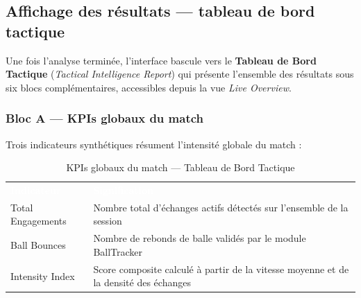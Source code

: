 \subsection{Affichage des résultats — tableau de bord tactique}
 
Une fois l'analyse terminée, l'interface bascule vers le \textbf{Tableau de Bord Tactique}
(\textit{Tactical Intelligence Report}) qui présente l'ensemble des résultats sous six blocs
complémentaires, accessibles depuis la vue \textit{Live Overview}.
 
 
\subsubsection*{Bloc A — KPIs globaux du match}
 
Trois indicateurs synthétiques résument l'intensité globale du match :
 
\begin{table}[H]
  \centering
  \renewcommand{\arraystretch}{1.3}
  \begin{tabularx}{\textwidth}{L{3.5cm} X}
    \textcolor{white}{\textbf{Indicateur}} &
    \textcolor{white}{\textbf{Signification}} \\
    Total Engagements & Nombre total d'échanges actifs détectés sur l'ensemble de la session \\
    Ball Bounces & Nombre de rebonds de balle validés par le module BallTracker \\
    Intensity Index & Score composite calculé à partir de la vitesse moyenne et de la densité des échanges \\
  \end{tabularx}
  \caption{KPIs globaux du match — Tableau de Bord Tactique}
  \label{tab:kpis_globaux}
\end{table}
 
